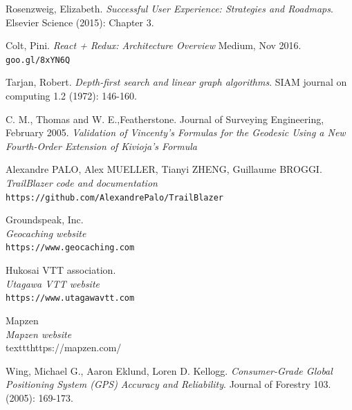 \documentclass[sigconf]{acmart}
\begin{document}
\begin{thebibliography}{9}
\bibitem{} 
Rosenzweig, Elizabeth.
\textit{Successful User Experience: Strategies and Roadmaps}.
Elsevier Science (2015): Chapter 3.

\bibitem{} 
Colt, Pini.
\textit{React + Redux: Architecture Overview}
Medium, Nov 2016.
\\\texttt{goo.gl/8xYN6Q}

\bibitem{} 
Tarjan, Robert.
\textit{Depth-first search and linear graph algorithms}.
SIAM journal on computing 1.2 (1972): 146-160.


\bibitem{}
C. M., Thomas and W. E.,Featherstone.
Journal of Surveying Engineering, February 2005.
\textit{Validation of Vincenty’s Formulas for the Geodesic Using
a New Fourth-Order Extension of Kivioja’s Formula}

\bibitem{}
Alexandre PALO, Alex MUELLER, Tianyi ZHENG, Guillaume BROGGI.
\\\textit{TrailBlazer code and documentation}
\\\texttt{https://github.com/AlexandrePalo/TrailBlazer}

\bibitem{}
Groundspeak, Inc.
\\\textit{Geocaching website}
\\\texttt{https://www.geocaching.com}

\bibitem{}
Hukosai VTT association.
\\\textit{Utagawa VTT website}
\\\texttt{https://www.utagawavtt.com}

\bibitem{}
Mapzen
\\\textit{Mapzen website}
\\texttt{https://mapzen.com/}

\bibitem{}
Wing, Michael G., Aaron Eklund, Loren D. Kellogg.
\textit{Consumer-Grade Global Positioning System (GPS) Accuracy and Reliability}. 
Journal of Forestry 103. (2005): 169-173.
\end{thebibliography}
\end{document}
